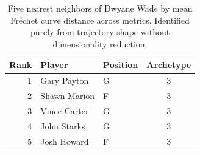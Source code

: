 \begin{table}[htbp]
  \centering\small
  \begin{tabular}{rllc}
    \toprule
    Rank & Player & Position & Archetype \\
    \midrule
    1 & Gary Payton & G & 3 \\
    2 & Shawn Marion & F & 3 \\
    3 & Vince Carter & G & 3 \\
    4 & John Starks & G & 3 \\
    5 & Josh Howard & F & 3 \\
    \bottomrule
  \end{tabular}
  \caption{Five nearest neighbors of Dwyane Wade by mean Fr\'{e}chet curve distance across metrics. Identified purely from trajectory shape without dimensionality reduction.}
  \label{tab:Dwyane_Wade_frechet_curve_neighbors}
\end{table}

